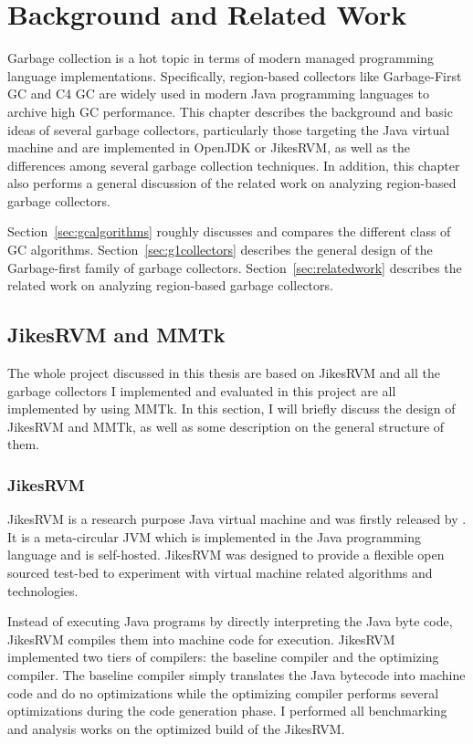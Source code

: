 \chapter{Background and Related Work}
\label{cha:background}

Garbage collection is a hot topic in terms of modern managed programming language
implementations. Specifically, region-based collectors like Garbage-First GC and
C4 GC are widely used in modern Java programming languages to archive high GC performance.
This chapter describes the background and basic ideas of several garbage collectors,
particularly those targeting the Java virtual machine and are implemented in OpenJDK or JikesRVM,
as well as the differences among several garbage collection techniques.
In addition, this chapter also performs a general discussion of the related work
on analyzing region-based garbage collectors.

Section~\ref{sec:gcalgorithms} roughly discusses and compares the different class of GC algorithms.
Section~\ref{sec:g1collectors} describes the general design of the Garbage-first family of garbage collectors.
Section~\ref{sec:relatedwork} describes the related work on analyzing region-based garbage collectors.

\section{JikesRVM and MMTk}

The whole project discussed in this thesis are based on JikesRVM and all the garbage collectors
I implemented and evaluated in this project are all implemented by using MMTk.
In this section, I will briefly discuss the design of JikesRVM and MMTk,
as well as some description on the general structure of them.

\subsection{JikesRVM}

JikesRVM is a research purpose Java virtual machine and was firstly released by \cite{alpern2005jikes}. It is a meta-circular JVM
which is implemented in the Java programming language and is self-hosted.
JikesRVM was designed to provide a flexible open sourced test-bed to
experiment with virtual machine related algorithms and technologies.

Instead of executing Java programs by directly interpreting the Java byte code,
JikesRVM compiles them into machine code for execution.
JikesRVM implemented two tiers of compilers: the baseline compiler and the optimizing compiler.
The baseline compiler simply translates the Java bytecode into machine code and do no
optimizations while the optimizing compiler performs several optimizations during the
code generation phase. I performed all benchmarking and analysis works on the
optimized build of the JikesRVM.

